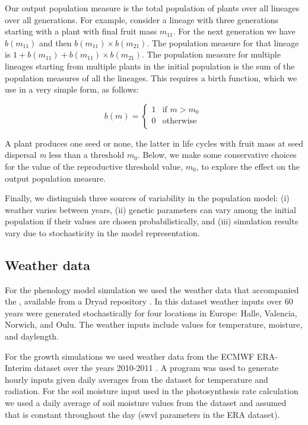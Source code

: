 \documentclass[phd]{infthesis}
\begin{document}
Our output population measure is the total population of plants over all
lineages over all generations. For example, consider a lineage with
three generations starting with a plant with final fruit mass
\(m_{11}\). For the next generation we have \(b(m_{11})\) and then
\(b(m_{11}) \times b(m_{21})\). The population measure for that lineage
is \(1 + b(m_{11}) + b(m_{11}) \times b(m_{21})\). The population
measure for multiple lineages starting from multiple plants in the
initial population is the sum of the population measures of all the
lineages. This requires a birth function, which we use in a very simple
form, as follows:

\[b\left( m \right) = \left\{ \begin{matrix}
1 & \text{if\ }m > m_{0} \\
0 & \text{otherwise} \\
\end{matrix} \right.\ \]

A plant produces one seed or none, the latter in life cycles with fruit
mass at seed dispersal \emph{m} less than a threshold \(m_{0}\). Below,
we make some conservative choices for the value of the reproductive
threshold value, \(m_{0}\), to explore the effect on the output
population measure.

Finally, we distinguish three sources of variability in the population
model: (i) weather varies between years, (ii) genetic parameters can
vary among the initial population if their values are chosen
probabilistically, and (iii) simulation results vary due to
stochasticity in the model representation.

\subsection{Weather data}
\label{weather-data}

For the phenology model simulation we used the weather data that accompanied the
\citet{(Burghardt et al., 2015).}, available from a Dryad repository
\citep{burghardt_data_2014}. In this dataset weather inputs over 60 years were
generated stochastically for four locations in Europe: Halle, Valencia, Norwich,
and Oulu. The weather inputs include values for temperature, moisture, and
daylength.

For the growth simulations we used weather data from the ECMWF ERA-Interim
dataset over the years 2010-2011 \citep{dee_era-interim_2011}.  A program was
used to generate hourly inputs given daily averages from the dataset for
temperature and radiation. For the soil moisture input used in the
photosynthesis rate calculation we used a daily average of soil moisture values
from the dataset and assumed that is constant throughout the day (swvl
parameters in the ERA dataset).
\end{document}
